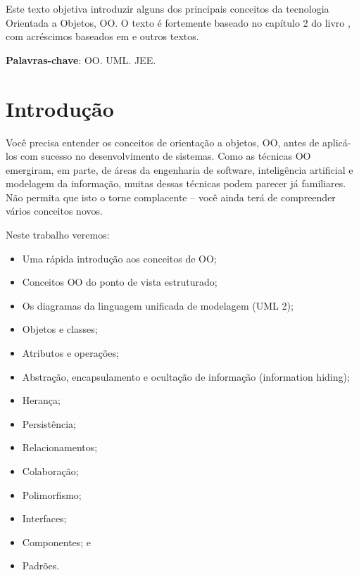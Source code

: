 \documentclass[
	article,			%
	12pt,				%
	openright,
	twoside,			%
	a4paper,			%
	english,			%
	french,
	brazil,				%
	sumario=tradicional
	]{abntex2}
\begin{document}

\frenchspacing 

\maketitle

\begin{resumoumacoluna}
Este texto objetiva introduzir alguns dos principais conceitos da tecnologia Orientada a Objetos, OO.
O texto é fortemente baseado no capítulo 2 do livro \cite{Ambler:TOP:3ed}, com acréscimos baseados em \cite{uml:j2ee} e outros textos.

\vspace{\onelineskip}
\noindent
 \textbf{Palavras-chave}: OO. UML. JEE.
\end{resumoumacoluna}

\textual

\section{Introdução}

Você precisa entender os conceitos de orientação a objetos, OO, antes de aplicá-los com sucesso no desenvolvimento de sistemas. Como as técnicas OO emergiram, em parte, de áreas da engenharia de software, inteligência artificial e modelagem da informação, muitas dessas técnicas podem parecer já familiares. Não permita que isto o torne complacente -- você ainda terá de compreender vários conceitos novos.

Neste trabalho veremos:

\begin{itemize}
\item Uma rápida introdução aos conceitos de OO;
\item Conceitos OO do ponto de vista estruturado;
\item Os diagramas da linguagem unificada de modelagem (UML 2);
\item Objetos e classes;
\item Atributos e operações;
\item Abstração, encapsulamento e ocultação de informação (information hiding);
\item Herança;
\item Persistência;
\item Relacionamentos;
\item Colaboração;
\item Polimorfismo;
\item Interfaces;
\item Componentes; e
\item Padrões.
\end{itemize}
\end{document}

